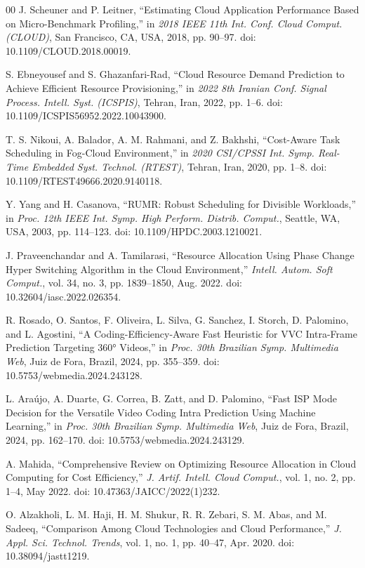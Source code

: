 \documentclass[conference]{IEEEtran}
\begin{document}
\begin{thebibliography}{00}
		 J. Scheuner and P. Leitner, ``Estimating Cloud Application Performance Based on Micro-Benchmark Profiling,'' in \emph{2018 IEEE 11th Int. Conf. Cloud Comput. (CLOUD)}, San Francisco, CA, USA, 2018, pp. 90--97. doi: 10.1109/CLOUD.2018.00019.
		
		 S. Ebneyousef and S. Ghazanfari-Rad, ``Cloud Resource Demand Prediction to Achieve Efficient Resource Provisioning,'' in \emph{2022 8th Iranian Conf. Signal Process. Intell. Syst. (ICSPIS)}, Tehran, Iran, 2022, pp. 1--6. doi: 10.1109/ICSPIS56952.2022.10043900.
		
		 T. S. Nikoui, A. Balador, A. M. Rahmani, and Z. Bakhshi, ``Cost-Aware Task Scheduling in Fog-Cloud Environment,'' in \emph{2020 CSI/CPSSI Int. Symp. Real-Time Embedded Syst. Technol. (RTEST)}, Tehran, Iran, 2020, pp. 1--8. doi: 10.1109/RTEST49666.2020.9140118.
		
		 Y. Yang and H. Casanova, ``RUMR: Robust Scheduling for Divisible Workloads,'' in \emph{Proc. 12th IEEE Int. Symp. High Perform. Distrib. Comput.}, Seattle, WA, USA, 2003, pp. 114--123. doi: 10.1109/HPDC.2003.1210021.
		
		 J. Praveenchandar and A. Tamilarasi, ``Resource Allocation Using Phase Change Hyper Switching Algorithm in the Cloud Environment,'' \emph{Intell. Autom. Soft Comput.}, vol. 34, no. 3, pp. 1839--1850, Aug. 2022. doi: 10.32604/iasc.2022.026354.
		
		 R. Rosado, O. Santos, F. Oliveira, L. Silva, G. Sanchez, I. Storch, D. Palomino, and L. Agostini, ``A Coding-Efficiency-Aware Fast Heuristic for VVC Intra-Frame Prediction Targeting 360° Videos,'' in \emph{Proc. 30th Brazilian Symp. Multimedia Web}, Juiz de Fora, Brazil, 2024, pp. 355--359. doi: 10.5753/webmedia.2024.243128.
		
		 L. Araújo, A. Duarte, G. Correa, B. Zatt, and D. Palomino, ``Fast ISP Mode Decision for the Versatile Video Coding Intra Prediction Using Machine Learning,'' in \emph{Proc. 30th Brazilian Symp. Multimedia Web}, Juiz de Fora, Brazil, 2024, pp. 162--170. doi: 10.5753/webmedia.2024.243129.
		
		 A. Mahida, ``Comprehensive Review on Optimizing Resource Allocation in Cloud Computing for Cost Efficiency,'' \emph{J. Artif. Intell. Cloud Comput.}, vol. 1, no. 2, pp. 1--4, May 2022. doi: 10.47363/JAICC/2022(1)232.
		
		 O. Alzakholi, L. M. Haji, H. M. Shukur, R. R. Zebari, S. M. Abas, and M. Sadeeq, ``Comparison Among Cloud Technologies and Cloud Performance,'' \emph{J. Appl. Sci. Technol. Trends}, vol. 1, no. 1, pp. 40--47, Apr. 2020. doi: 10.38094/jastt1219.
		

\end{thebibliography}
\end{document}
